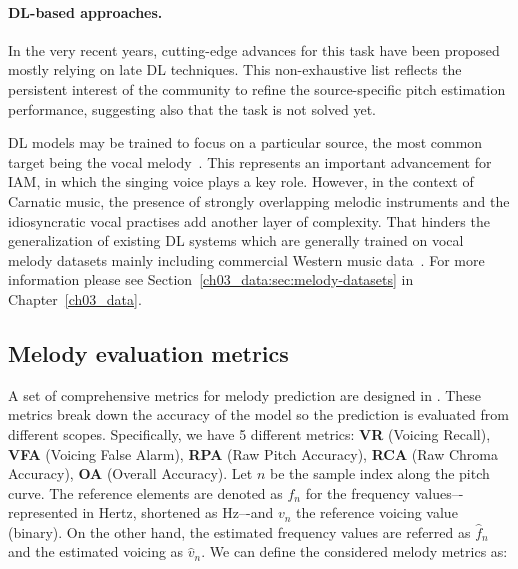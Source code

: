 \paragraph*{\acrshort{DL}-based approaches.} In the very recent years, cutting-edge advances for this task have been proposed~\citep{bittner-deep_salience,jia-tandem_filter,su-patched_cnn,hsieh-encoder_decoder,dong-residual_network,kum-recurrent_network,kum-teacher_student,yu-ftanet,yu-MCSSME,saxena-interactive_extraction,yu-transformer_pitch,hu-singing} mostly relying on late \acrshort{DL} techniques. This non-exhaustive list reflects the persistent interest of the community to refine the source-specific pitch estimation performance, suggesting also that the task is not solved yet.

DL models may be trained to focus on a particular source, 
the most common target being the vocal melody~\citep{chou-hybrid_network,kum-teacher_student,yu-ftanet}. This represents an important advancement for \acrshort{IAM}, in which the singing voice plays a key role. 
%
However, in the context of Carnatic music, the presence of strongly overlapping melodic instruments and the idiosyncratic vocal practises add another layer of complexity. That hinders the generalization of existing \acrshort{DL} systems which are generally trained on vocal melody datasets mainly including commercial Western music data~\citep{hsu-mir1k,bittner-medleydb}. For more information please see Section~\ref{ch03_data:sec:melody-datasets} in Chapter~\ref{ch03_data}.
%



\subsection{Melody evaluation metrics}
\label{sec:evaluation_metrics}
A set of comprehensive metrics for melody prediction are designed in \citep{bittner-eval}. These metrics break down the accuracy of the model so the prediction is evaluated from different scopes. Specifically, we have 5 different metrics: \textbf{VR} (Voicing Recall), \textbf{VFA} (Voicing False Alarm), \textbf{RPA} (Raw Pitch Accuracy), \textbf{RCA} (Raw Chroma Accuracy), \textbf{OA} (Overall Accuracy).  
Let $n$ be the sample index along the pitch curve. The reference elements are denoted as $f_{n}$ for the frequency values–-represented in Hertz, shortened as Hz–-and $v_{n}$ the reference voicing value (binary). On the other hand, the estimated frequency values are referred as $\hat{f}_{n}$ and the estimated voicing as $\hat{v}_{n}$. We can define the considered melody metrics as:

